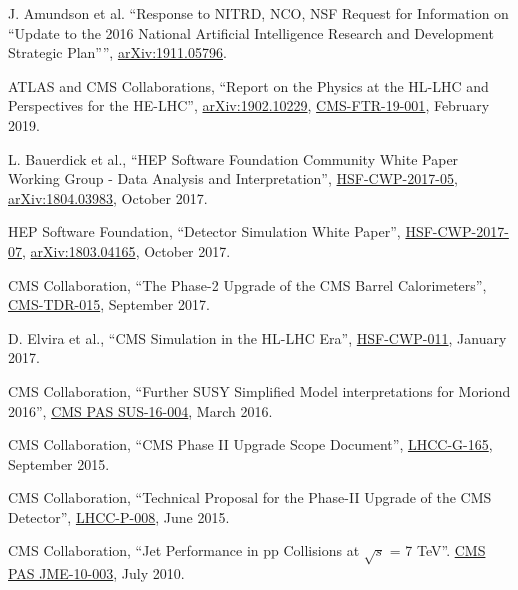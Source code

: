 \begin{description}[leftmargin=12pt,font=\normalfont,labelsep=0em]
\item J. Amundson et al. ``Response to NITRD, NCO, NSF Request for Information on ``Update to the 2016 National Artificial Intelligence Research and Development Strategic Plan'''', \href{https://arxiv.org/abs/1911.05796}{arXiv:1911.05796}. %
\item \begin{sloppypar}ATLAS and CMS Collaborations, ``Report on the Physics at the HL-LHC and Perspectives for the HE-LHC'', \href{http://arxiv.org/abs/arXiv:1902.10229}{arXiv:1902.10229}, \href{https://cds.cern.ch/record/2651134}{CMS-FTR-19-001}, February 2019.\end{sloppypar} %
\item L. Bauerdick et al., ``HEP Software Foundation Community White Paper Working Group - Data Analysis and Interpretation'', \href{http://hepsoftwarefoundation.org/activities/cwp.html}{HSF-CWP-2017-05}, \href{https://arxiv.org/abs/1804.03983}{arXiv:1804.03983}, October 2017. %
\item HEP Software Foundation, ``Detector Simulation White Paper'', \href{http://hepsoftwarefoundation.org/activities/cwp.html}{HSF-CWP-2017-07}, \href{https://arxiv.org/abs/1803.04165}{arXiv:1803.04165}, October 2017. %
\item CMS Collaboration, ``The Phase-2 Upgrade of the CMS Barrel Calorimeters'', \href{https://cds.cern.ch/record/2283187}{CMS-TDR-015}, September 2017.
\item D. Elvira et al., ``CMS Simulation in the HL-LHC Era'', \href{http://hepsoftwarefoundation.org/cwp-whitepapers.html}{HSF-CWP-011}, January 2017.
\item CMS Collaboration, ``Further SUSY Simplified Model interpretations for Moriond 2016'', \href{http://cds.cern.ch/record/2140312}{CMS PAS SUS-16-004}, March 2016. %
\item CMS Collaboration, ``CMS Phase II Upgrade Scope Document'', \href{https://cds.cern.ch/record/2055167}{LHCC-G-165}, September 2015.
\item CMS Collaboration, ``Technical Proposal for the Phase-II Upgrade of the CMS Detector'', \href{http://cds.cern.ch/record/2020886}{LHCC-P-008}, June 2015. %
\item CMS Collaboration, ``Jet Performance in pp Collisions at $\sqrt{s}$ = 7 TeV''. \href{http://cds.cern.ch/record/1279362}{CMS PAS JME-10-003}, July 2010. %
\end{description}

